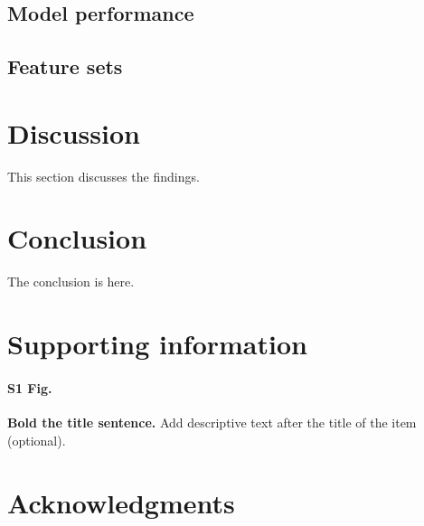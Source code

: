 \documentclass[10pt,letterpaper]{article}
\begin{document}
\begin{landscape}
  \begin{table}[!ht]
    \centering
    \caption{ROC AUC scores for Cohorts 1 to 7 for the feature sets F1 to F9}
    \label{table:results}
    \footnotesize
  \end{table}
\end{landscape}
\restoregeometry

\subsection*{Model performance}

\subsection*{Feature sets}


\section*{Discussion}

This section discusses the findings.

\section*{Conclusion}

The conclusion is here. 

\section*{Supporting information}

\paragraph*{S1 Fig.}
\label{S1_Fig}
{\bf Bold the title sentence.} Add descriptive text after the title of the item (optional).

\section*{Acknowledgments}

\nolinenumbers


\end{document}
